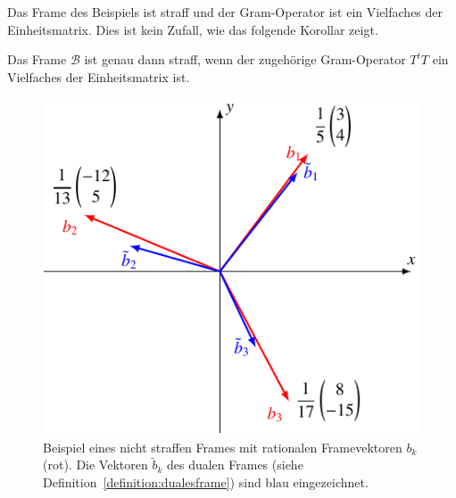 Das Frame des Beispiels ist straff und der Gram-Operator ist ein
Vielfaches der Einheitsmatrix.
Dies ist kein Zufall, wie das folgende Korollar zeigt.

\begin{korollar}
Das Frame $\mathcal{B}$ ist genau dann straff, wenn der zugehörige
Gram-Operator $T^tT$ ein Vielfaches der Einheitsmatrix ist.
\end{korollar}

\begin{figure}
\centering
\includegraphics{chapters/1-geometrie/images/beispiel2.pdf}
\caption{Beispiel eines nicht straffen Frames mit rationalen Framevektoren
$b_k$ (rot).
Die Vektoren $\tilde{b}_k$ des dualen Frames
(siehe Definition~\ref{definition:dualesframe}) sind blau eingezeichnet.
\label{frame:beispiel2}}
\end{figure}

